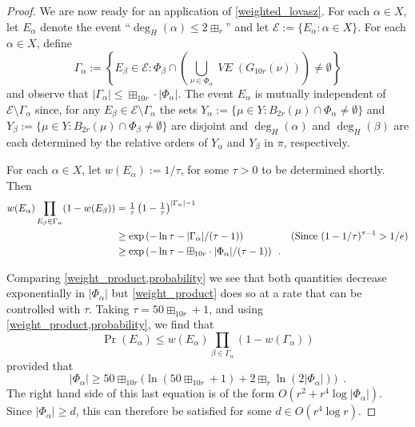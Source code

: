 \documentclass{patmorin}
\newcommand{\vol}[1]{\boxplus_{#1}}
\DeclareMathOperator{\VE}{\mathit{VE}}
\begin{document}
\begin{proof}
  We are now ready for an application of \cref{weighted_lovasz}.  For each $\alpha\in X$, let $E_\alpha$ denote the event ``$\deg_H(\alpha)\le 2\vol{r}$'' and let $\mathcal{E}:=\{E_\alpha:\alpha\in X\}$. For each $\alpha\in X$, define
  \[
     \Gamma_\alpha := \left\{E_\beta \in \mathcal{E}: \Phi_\beta\cap \left(\bigcup_{\nu\in \Phi_\alpha} \VE(G_{10r}(\nu))\right)\neq\emptyset\right\}
  \]
  and observe that $|\Gamma_\alpha|\le \vol{10r}\cdot|\Phi_\alpha|$.
  The event $E_\alpha$ is mutually independent of $\mathcal{E}\setminus\Gamma_\alpha$ since, for any $E_\beta\in\mathcal{E}\setminus\Gamma_\alpha$ the sets $Y_\alpha:=\{\mu\in Y:B_{2r}(\mu)\cap \Phi_\alpha\neq\emptyset\}$ and $Y_\beta:=\{\mu\in Y:B_{2r}(\mu)\cap \Phi_\beta\neq\emptyset\}$ are disjoint and $\deg_H(\alpha)$ and $\deg_H(\beta)$ are each determined by the relative orders of $Y_\alpha$ and $Y_\beta$ in $\pi$, respectively.

  For each $\alpha\in X$, let $w(E_\alpha):=1/\tau$, for some $\tau>0$ to be determined shortly.  Then
  \begin{align}
    w(E_\alpha)\prod_{E_\beta\in\Gamma_\alpha} (1-w(E_\beta))
    & = \tfrac{1}{\tau}\left(1-\tfrac{1}{\tau}\right)^{|\Gamma_\alpha|-1} \notag \\
    & \ge \exp\left(-\ln\tau - |\Gamma_\alpha|/(\tau-1)\right) & \text{(Since $(1-1/\tau)^{\tau-1} > 1/e$)} \notag \\
    & \ge \exp\left(-\ln\tau - \vol{10r}\cdot|\Phi_\alpha|/(\tau-1)\right) \enspace . \label{weight_product}
  \end{align}

  Comparing \cref{weight_product,probability} we see that both quantities decrease exponentially in $|\Phi_\alpha|$ but \cref{weight_product} does so at a rate that can be controlled with $\tau$.
  Taking $\tau = {50\vol{10r}}+1$, and using \cref{weight_product,probability}, we find that
  \[
     \Pr\left(E_\alpha\right) \le w(E_\alpha)\prod_{\beta\in\Gamma_\alpha}(1-w(\Gamma_\alpha))
  \]
  provided that
  \[   |\Phi_\alpha| \ge {50\vol{10r}}\big(\ln({50\vol{10r}}+1) + {2\vol{r}}\ln(2|\Phi_\alpha|)\big) \enspace .
  \]
  The right hand side of this last equation is of the form $O(r^2+r^4\log|\Phi_\alpha|)$.  Since $|\Phi_\alpha|\ge d$, this can therefore be satisfied for some $d\in O(r^4\log r)$.



\end{proof}
\end{document}
